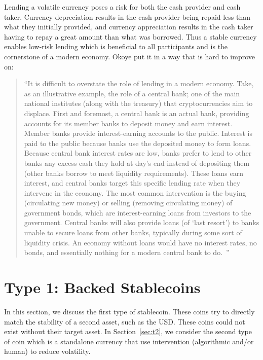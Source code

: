 Lending a volatile currency poses a risk for both the cash provider and cash taker. Currency depreciation results in the cash provider being repaid less than what they initially provided, and currency appreciation results in the cash taker having to repay a great amount than what was borrowed. Thus a stable currency enables low-risk lending which is beneficial to all participants and is the cornerstone of a modern economy. Okoye \etal put it in a way that is hard to improve on:

\begin{quote}

``It is difficult to overstate the role of lending in a modern economy. Take, as an illustrative example, the role of a central bank; one of the main national institutes (along with the treasury) that cryptocurrencies aim to displace. First and foremost, a central bank is an actual bank, providing accounts for its member banks to deposit money and earn interest. Member banks provide interest-earning accounts to the public. Interest is paid to the public because banks use the deposited money to form loans. Because central bank interest rates are low, banks prefer to lend to other banks any excess cash they hold at day's end instead of depositing them (other banks borrow to meet liquidity requirements). These loans earn interest, and central banks target this specific lending rate when they intervene in the economy. The most common intervention is the buying (circulating new money) or selling (removing circulating money) of government bonds, which are interest-earning loans from investors to the government. Central banks will also provide loans (of `last resort') to banks unable to secure loans from other banks, typically during some sort of liquidity crisis. An economy without loans would have no interest rates, no bonds, and essentially nothing for a modern central bank to do.~\cite{okoyetoward}''

\end{quote}



\section{Type 1: Backed Stablecoins}
\label{sec:t1}

In this section, we discuss the first type of stablecoin. These coins try to directly match the stability of a second asset, such as the USD. These coins could not exist without their target asset. In Section~\ref{sec:t2}, we consider the second type of coin which is a standalone currency that use intervention (algorithmic and/or human) to reduce volatility.

